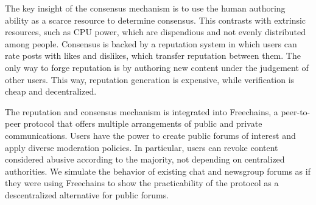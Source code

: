 \documentclass[12pt]{article}
\newcommand{\FC}       {Freechains\xspace}
\begin{document}
The key insight of the consensus mechanism is to use the human authoring
ability as a scarce resource to determine consensus.
This contrasts with extrinsic resources, such as CPU power, which are
dispendious and not evenly distributed among people.
%
Consensus is backed by a reputation system in which users can rate posts with
likes and dislikes, which transfer reputation between them.
The only way to forge reputation is by authoring new content under the
judgement of other users.
This way, reputation generation is expensive, while verification is cheap and
decentralized.

The reputation and consensus mechanism is integrated into \FC, a peer-to-peer
protocol that offers multiple arrangements of public and private
communications.
Users have the power to create public forums of interest and apply diverse
moderation policies.
In particular, users can revoke content considered abusive according to the
majority, not depending on centralized authorities.
%
We simulate the behavior of existing chat and newsgroup forums as if they were
using \FC to show the practicability of the protocol as a descentralized
alternative for public forums.
\end{document}

